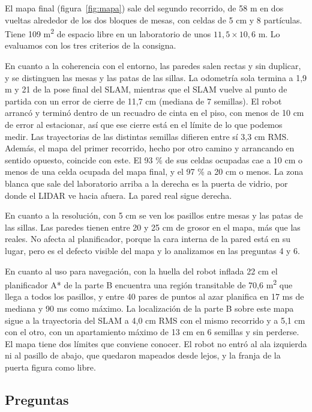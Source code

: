 El mapa final (figura~\ref{fig:mapa}) sale del segundo recorrido, de 58 m en
dos vueltas alrededor de los dos bloques de mesas, con celdas de 5 cm y 8
partículas. Tiene 109 m\textsuperscript{2} de espacio libre en un laboratorio
de unos $11{,}5 \times 10{,}6$ m. Lo evaluamos con los tres criterios de la
consigna.

En cuanto a la coherencia con el entorno, las paredes salen rectas y sin
duplicar, y se distinguen las mesas y las patas de las sillas. La odometría
sola termina a 1,9 m y 21\textdegree{} de la pose final del SLAM, mientras que
el SLAM vuelve al punto de partida con un error de cierre de 11,7 cm (mediana
de 7 semillas). El robot arrancó y terminó dentro de un recuadro de cinta en el
piso, con menos de 10 cm de error al estacionar, así que ese cierre está en el
límite de lo que podemos medir. Las trayectorias de las distintas semillas
difieren entre sí 3,3 cm RMS. Además, el mapa del primer recorrido, hecho por
otro camino y arrancando en sentido opuesto, coincide con este. El 93 \% de sus
celdas ocupadas cae a 10 cm o menos de una celda ocupada del mapa final, y el
97 \% a 20 cm o menos. La zona blanca que sale del laboratorio
arriba a la derecha es la puerta de vidrio, por donde el LIDAR ve hacia afuera.
La pared real sigue derecha.

En cuanto a la resolución, con 5 cm se ven los pasillos entre mesas y las patas
de las sillas. Las paredes tienen entre 20 y 25 cm de grosor en el mapa, más
que las reales. No afecta al planificador, porque la cara interna de la pared
está en su lugar, pero es el defecto visible del mapa y lo analizamos en las
preguntas 4 y 6.

En cuanto al uso para navegación, con la huella del robot inflada 22 cm el
planificador A* de la parte B encuentra una región transitable de
70,6 m\textsuperscript{2} que llega a todos los pasillos, y entre 40 pares de
puntos al azar planifica en 17 ms de mediana y 90 ms como máximo. La
localización de la parte B sobre este mapa sigue a la trayectoria del SLAM a
4,0 cm RMS con el mismo recorrido y a 5,1 cm con el otro, con un apartamiento
máximo de 13 cm en 6 semillas y sin perderse. El
mapa tiene dos límites que conviene conocer. El robot no entró al ala izquierda
ni al pasillo de abajo, que quedaron mapeados desde lejos, y la franja de la
puerta figura como libre.

\subsection{Preguntas}

